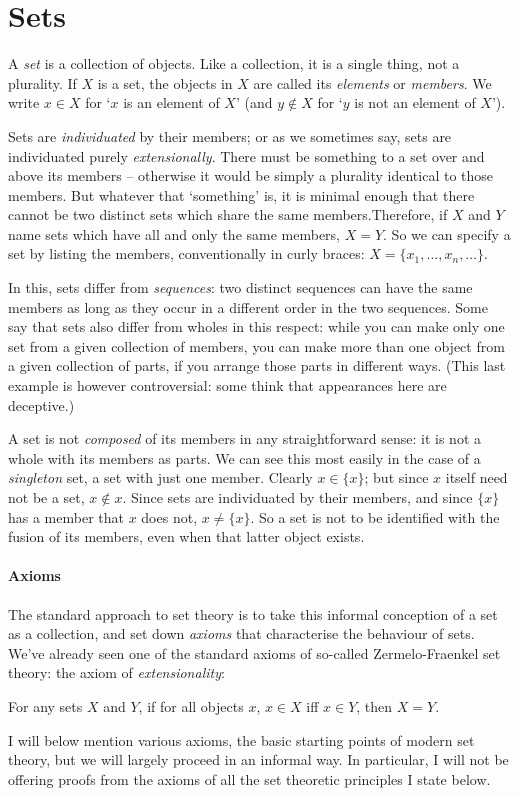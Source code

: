 
\section{Sets}

A \emph{set} is a collection of objects. Like a collection, it is a single thing, not a plurality. If $X$ is a set, the objects in $X$ are called its \emph{elements} or \emph{members}. We write $x \in X$ for `$x$ is an element of $X$' (and $y \notin X$ for `$y$ is not an element of $X$').

 Sets are \emph{individuated} by their members; or as we sometimes say, sets are individuated purely \emph{extensionally}. There must be something to a set over and above its members – otherwise it would be simply a plurality identical to those members. But whatever that ‘something’ is, it is minimal enough that there cannot be two distinct sets which share the same members.Therefore, if $X$ and $Y$ name sets which have all and only the same members, $X = Y$. So we can specify a set by listing the members, conventionally in curly braces: $X = \{x_{1},...,x_{n},…\}$. 

 In this, sets differ from \emph{sequences}: two distinct sequences can have the same members as long as they occur in a different order in the two sequences. Some say that sets also differ from wholes in this respect: while you can make only one set from a given collection of members, you can make more than one object from a given collection of parts, if you arrange those parts in different ways. (This last example is however controversial: some think that appearances here are deceptive.) 

A set is not \emph{composed} of its members in any straightforward sense: it is not a whole with its members as parts. We can see this most easily in the case of a \emph{singleton} set, a set with just one member. Clearly $x \in \{x\}$; but since $x$ itself need not be a set, $x \notin x$. Since sets are individuated by their members, and since $\{x\}$ has a member that $x$ does not, $x\neq\{x\}$. So a set is not to be identified with the fusion of its members, even when that latter object exists.

\paragraph{Axioms} The standard approach to set theory is to take this informal conception of a set as a collection, and set down \emph{axioms} that characterise the behaviour of sets. We've already seen one of the standard axioms of so-called Zermelo-Fraenkel set theory: the axiom of \emph{extensionality}: \begin{axiom}[Extensionality]
  For any sets $X$ and $Y$, if for all objects $x$, $x\in X$ iff $x\in Y$, then $X=Y$.
\end{axiom} I will below mention various axioms, the basic starting points of modern set theory, but we will largely proceed in an informal way. In particular, I will not be offering proofs from the axioms of all the set theoretic principles I state below.


